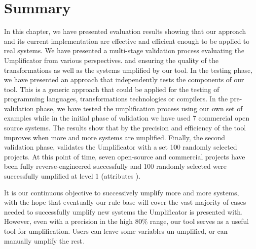 \section{Summary}

In this chapter, we have presented evaluation results showing that our approach and its current implementation are effective and efficient enough to be applied to real systems.
We have presented a multi-stage validation process evaluating the Umplificator from various perspectives.
and ensuring the quality of the transformations as well as the systems umplified by our tool. In the testing phase, we have presented an approach that independently tests the components of our tool. This is a generic approach that could be applied for the testing of programming languages, transformations technologies or compilers. In the pre-validation phase, we have tested the umplification process using our own set of examples while in the initial phase of validation we have used 7 commercial open source systems. The results show that by the precision and efficiency of the tool improves when more and more systems are umplified. Finally, the second validation phase, validates the Umplificator with a set 100 randomly selected projects. At this point of time, seven open-source and commercial projects have been fully reverse-engineered successfully and 100 randomly selected were successfully umplified at level 1 (attributes ). 

It is our continuous objective to successively umplify more and more systems, with the hope that eventually our rule base will cover the vast majority of cases needed to successfully umplify new systems the Umplificator is presented with. However, even with a precision in the high 80\% range, our tool serves as a useful tool for umplification. Users can leave some variables un-umplified, or can manually umplify the rest.  
